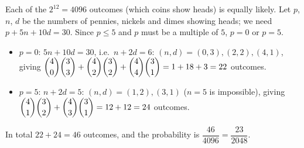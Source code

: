 Each of the $2^{12}=4096$ outcomes (which coins show heads) is equally likely. Let $p$, $n$, $d$ be the numbers of pennies, nickels and dimes showing heads; we need $p+5n+10d=30$. Since $p\le5$ and $p$ must be a multiple of $5$, $p=0$ or $p=5$.
\begin{itemize}
\item $p=0$: $5n+10d=30$, i.e.\ $n+2d=6$: $(n,d)=(0,3),(2,2),(4,1)$, giving $\dbinom40\dbinom33+\dbinom42\dbinom32+\dbinom44\dbinom31=1+18+3=22$ outcomes.
\item $p=5$: $n+2d=5$: $(n,d)=(1,2),(3,1)$ ($n=5$ is impossible), giving $\dbinom41\dbinom32+\dbinom43\dbinom31=12+12=24$ outcomes.
\end{itemize}
In total $22+24=46$ outcomes, and the probability is $\dfrac{46}{4096}=\boxed{\dfrac{23}{2048}}$.
